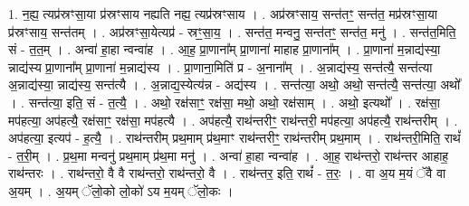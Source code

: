 \documentclass[17pt]{extarticle}
\begin{document}
1. न॒ह्य॒ त्यप्र॑स्रꣳसा॒या प्र॑स्रꣳसाय नह्यति नह्य॒ त्यप्र॑स्रꣳसाय । . अप्र॑स्रꣳसाय॒ सन्त॑तꣳ॒॒ सन्त॑त॒ मप्र॑स्रꣳसा॒या प्र॑स्रꣳसाय॒ सन्त॑तम् । . अप्र॑स्रꣳसा॒येत्यप्र॑ - स्रꣳ॒॒सा॒य॒ । . सन्त॑त॒ मन्वनु॒ सन्त॑तꣳ॒॒ सन्त॑त॒ मनु॑ । . सन्त॑त॒मिति॒ सं - त॒त॒म् । . अन्वा॑ हा॒हा न्वन्वा॑ह । . आ॒ह॒ प्रा॒णाना᳚म् प्रा॒णाना॑ माहाह प्रा॒णाना᳚म् । . प्रा॒णाना॑ म॒न्नाद्य॑स्या॒ न्नाद्य॑स्य प्रा॒णाना᳚म् प्रा॒णाना॑ म॒न्नाद्य॑स्य । . प्रा॒णाना॒मिति॑ प्र - अ॒नाना᳚म् । . अ॒न्नाद्य॑स्य॒ सन्त॑त्यै॒ सन्त॑त्या अ॒न्नाद्य॑स्या॒ न्नाद्य॑स्य॒ सन्त॑त्यै । . अ॒न्नाद्य॒स्येत्य॑न्न - अद्य॑स्य । . सन्त॑त्या॒ अथो॒ अथो॒ सन्त॑त्यै॒ सन्त॑त्या॒ अथो᳚ । . सन्त॑त्या॒ इति॒ सं - त॒त्यै॒ । . अथो॒ रक्ष॑साꣳ॒॒ रक्ष॑सा॒ मथो॒ अथो॒ रक्ष॑साम् । . अथो॒ इत्यथो᳚ । . रक्ष॑सा॒ मप॑हत्या॒ अप॑हत्यै॒ रक्ष॑साꣳ॒॒ रक्ष॑सा॒ मप॑हत्यै । . अप॑हत्यै॒ राथ॑न्तरीꣳ॒॒ राथ॑न्तरी॒ मप॑हत्या॒ अप॑हत्यै॒ राथ॑न्तरीम् । . अप॑हत्या॒ इत्यप॑ - ह॒त्यै॒ । . राथ॑न्तरीम् प्रथ॒माम् प्र॑थ॒माꣳ राथ॑न्तरीꣳ॒॒ राथ॑न्तरीम् प्रथ॒माम् । . राथ॑न्तरी॒मिति॒ राथं᳚ - त॒री॒म् । . प्र॒थ॒मा मन्वनु॑ प्रथ॒माम् प्र॑थ॒मा मनु॑ । . अन्वा॑ हा॒हा न्वन्वा॑ह । . आ॒ह॒ राथ॑न्तरो॒ राथ॑न्तर आहाह॒ राथ॑न्तरः । . राथ॑न्तरो॒ वै वै राथ॑न्तरो॒ राथ॑न्तरो॒ वै । . राथ॑न्तर॒ इति॒ राथं᳚ - त॒रः॒ । . वा अ॒य म॒यं ॅवै वा अ॒यम् । . अ॒यम् ॅलो॒को लो॒को॑ ऽय म॒यम् ॅलो॒कः । \newline
\end{document}
